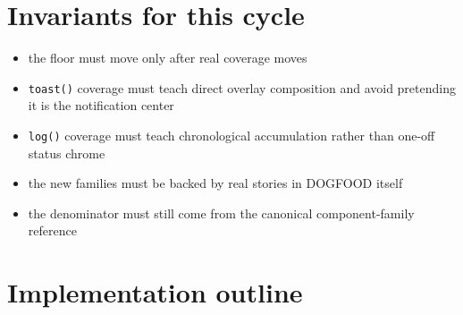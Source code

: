 \section{Invariants for this cycle}\label{record-069-invariants-for-this-cycle}

\begin{itemize}
\tightlist
\item
  the floor must move only after real coverage moves
\item
  \texttt{t\allowbreak{}o\allowbreak{}a\allowbreak{}s\allowbreak{}t\allowbreak{}(\allowbreak{})} coverage must teach direct overlay composition and avoid pretending it is the notification center
\item
  \texttt{l\allowbreak{}o\allowbreak{}g\allowbreak{}(\allowbreak{})} coverage must teach chronological accumulation rather than one-off status chrome
\item
  the new families must be backed by real stories in DOGFOOD itself
\item
  the denominator must still come from the canonical component-family reference
\end{itemize}

\section{Implementation outline}\label{record-069-implementation-outline}

